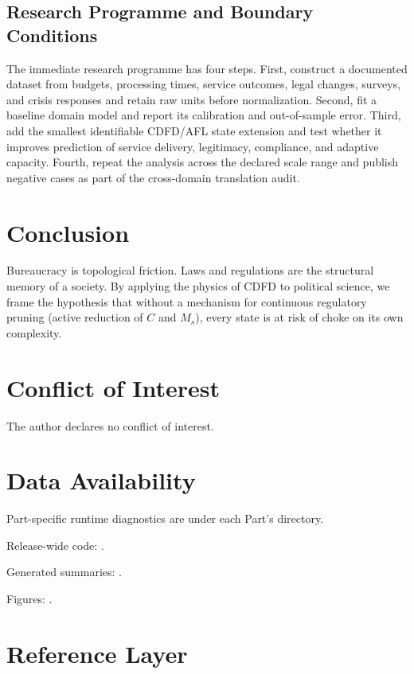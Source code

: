 \documentclass[11pt,a4paper]{article}
\begin{document}
\subsection{Research Programme and Boundary Conditions}

The immediate research programme has four steps. First, construct a documented
dataset from budgets, processing times, service outcomes, legal changes, surveys, and crisis responses and retain raw units before normalization.
Second, fit a baseline domain model and report its calibration and out-of-sample
error. Third, add the smallest identifiable CDFD/AFL state extension and test
whether it improves prediction of service delivery, legitimacy, compliance, and adaptive capacity. Fourth, repeat the
analysis across the declared scale range and publish negative cases as part of
the cross-domain translation audit.


\section{Conclusion}
Bureaucracy is topological friction. Laws and regulations are the structural memory of a society. By applying the physics of CDFD to political science, we frame the hypothesis that without a mechanism for continuous regulatory pruning (active reduction of $C$ and $M_s$), every state is at risk of choke on its own complexity.
\section*{Conflict of Interest} The author declares no conflict of interest.
\section*{Data Availability}
Part-specific runtime diagnostics are under each Part's  directory.

Release-wide code: .

Generated summaries: .

Figures: .


\section{Reference Layer}


\end{document}
